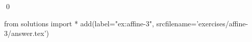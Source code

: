 
\begin{ex} 
  \label{ex:affine-3}
  
  \qed
\end{ex} 
\begin{python0}
from solutions import *
add(label="ex:affine-3",
    srcfilename='exercises/affine-3/answer.tex') 
\end{python0}
